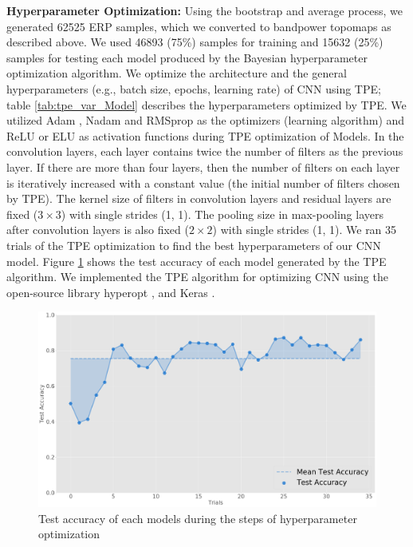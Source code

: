 \documentclass{article}
\begin{document}
\textbf{Hyperparameter Optimization:} Using the bootstrap and average process, we generated 62525 ERP samples, which we converted to bandpower topomaps as described above. We used 46893 (75\%) samples for training and 15632 (25\%) samples for testing each model produced by the Bayesian hyperparameter optimization algorithm. We optimize the architecture and the general hyperparameters (e.g., batch size, epochs, learning rate) of CNN using TPE; table \ref{tab:tpe_var_Model} describes the hyperparameters optimized by TPE. We utilized Adam \cite{adam}, Nadam \cite{nadam} and RMSprop as the optimizers (learning algorithm) and ReLU \cite{relu, relu_2} or ELU \cite{elu} as activation functions during TPE optimization of Models. In the convolution layers, each layer contains twice the number of filters as the previous layer. If there are more than four layers, then the number of filters on each layer is iteratively increased with a constant value (the initial number of filters chosen by TPE). The kernel size of filters in convolution layers and residual layers are fixed ($3 \times 3$) with single strides (1, 1). The pooling size in max-pooling layers after convolution layers is also fixed ($2 \times 2$) with single strides (1, 1). We ran 35 trials of the TPE optimization to find the best hyperparameters of our CNN model. Figure \ref{test_acc_tpe} shows the test accuracy of each model generated by the TPE algorithm. We implemented the TPE algorithm for optimizing CNN using the open-source library hyperopt \cite{hyperopt}, and Keras \cite{keras}.

\begin{figure}[ht]
\vskip 0.2in
\begin{center}
\centerline{\includegraphics[width=\columnwidth]{Images/spsm_test_acc}}
\caption[Accuracy and loss curve of the best model]{Test accuracy of each models during the steps of hyperparameter optimization}
\end{center}
\vskip -0.2in
\label{test_acc_tpe}
\end{figure}
\end{document}
